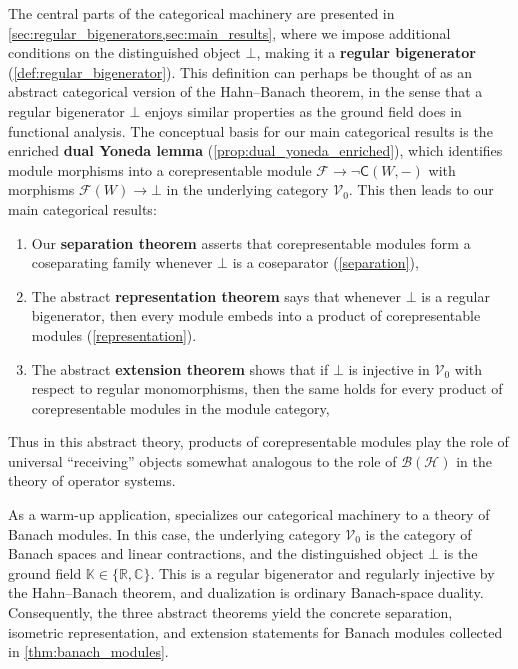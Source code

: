 \documentclass[11pt,onecolumn]{article}
\newcommand{\R}{\mathbb{R}}
\newcommand{\C}{\mathbb{C}}
\newcommand{\K}{\mathbb{K}}
\newcommand{\cV}{\mathscr{V}}
\newcommand{\cC}{\mathsf{C}}
\theoremstyle{plain}
\theoremstyle{remark}
\theoremstyle{definition}
\begin{document}
The central parts of the categorical machinery are presented in \cref{sec:regular_bigenerators,sec:main_results},
where we impose additional conditions on the distinguished object $\bot$, making it a \textbf{regular bigenerator} (\cref{def:regular_bigenerator}).
This definition can perhaps be thought of as an abstract categorical version of the Hahn--Banach theorem,
in the sense that a regular bigenerator $\bot$ enjoys similar properties as the ground field does in functional analysis.
The conceptual basis for our main categorical results is the enriched \textbf{dual Yoneda lemma} (\cref{prop:dual_yoneda_enriched}),
which identifies module morphisms into a corepresentable module $\mathcal{F} \to \neg \cC(W, -)$ with morphisms $\mathcal{F}(W) \to \bot$ in the underlying category $\cV_0$.
This then leads to our main categorical results:
\begin{enumerate}
	\item\label{item:separation}
			Our \textbf{separation theorem} asserts that corepresentable modules form a coseparating family whenever $\bot$ is a coseparator (\cref{separation}),
	\item The abstract \textbf{representation theorem} says that whenever $\bot$ is a regular bigenerator, then every module embeds into a product of corepresentable modules (\cref{representation}).
	\item\label{item:extension}
		The abstract \textbf{extension theorem} shows that if $\bot$ is injective in $\cV_0$ with respect to regular monomorphisms,
		then the same holds for every product of corepresentable modules in the module category,
\end{enumerate}
Thus in this abstract theory, products of corepresentable modules play the role of universal ``receiving'' objects somewhat analogous to the role of $\mathcal{B}(\mathcal{H})$ in the theory of operator systems.

As a warm-up application,  specializes our categorical machinery to a theory of Banach modules.
In this case, the underlying category $\cV_0$ is the category of Banach spaces and linear contractions, and the distinguished object $\bot$ is the ground field $\K \in \{\R, \C\}$.
This is a regular bigenerator and regularly injective by the Hahn--Banach theorem, and dualization is ordinary Banach-space duality.
Consequently, the three abstract theorems yield the concrete separation, isometric representation, and extension statements for Banach modules collected in \cref{thm:banach_modules}.
\end{document}
